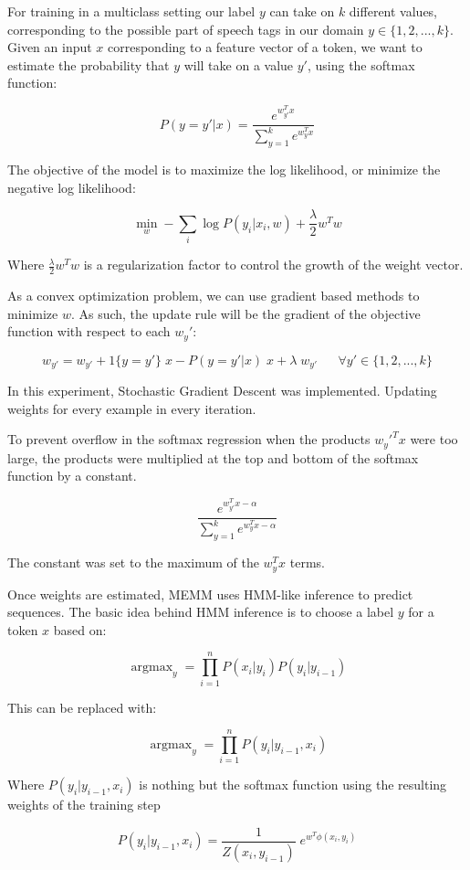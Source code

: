 \documentclass[11pt]{article}
\DeclareMathOperator{\argmax}{argmax}
\begin{document}
For training in a multiclass setting our label $y$ can take on $k$ different values, corresponding to the possible part of speech tags in our domain $y \in \{1,2, ..., k\}$. Given an input $x$ corresponding to a feature vector of a token, we want to estimate the probability that $y$ will take on a value $y'$, using the softmax function:

$$P(y=y'|x) = \frac{e^{w_{y'}^{T}x}}{\sum_{y=1}^{k} e^{w_{y}^{T} x}}$$

The objective of the model is to maximize the log likelihood, or minimize the negative log likelihood:

$$\min_w - \sum_{i} \log { P (y_i|x_i, w)} + \frac{\lambda}{2}	w^{T}w $$ 

Where $\frac{\lambda}{2}	w^{T}w $ is a regularization factor to control the growth of the weight vector. 

As a convex optimization problem, we can use gradient based methods to minimize $w$. As such, the update rule will be the gradient of the objective function with respect to each $w_y'$:

$$w_{y'} = w_{y'} + 1 \{y = y'\} \; x -  P(y = y'|x) \; x + \lambda \; w_{y'} \;\;\;\;\;\ \forall y' \in \{1,2, ... , k\}$$

In this experiment, Stochastic Gradient Descent was implemented. Updating weights for every example in every iteration. 

To prevent overflow in the softmax regression when the products $w_y'^{T}x$ were too large, the products were multiplied at the top and bottom of the softmax function by a constant. 

$$\frac{e^{w_{y'}^Tx - \alpha}}{\sum_{y=1}^{k} e^{w_{y}^T x - \alpha}}$$

The constant was set to the maximum of the $w_{y}^T x$ terms. 

Once weights are estimated, MEMM uses HMM-like inference to predict sequences. The basic idea behind HMM inference is to choose a label $y$ for a token $x$ based on: 

$$\argmax_y = \prod_{i = 1}^{n} P(x_i | y_i) P(y_i|y_{i-1})$$

This can be replaced with:

$$\argmax_y = \prod_{i=1}^{n} P(y_i | y_{i-1}, x_i)$$

Where $P(y_i | y_{i-1}, x_i)$ is nothing but the softmax function using the resulting weights of the training step

$$P(y_i | y_{i-1}, x_i) = \frac{1}{Z(x_i, y_{i-1})} \; e^{w^{T}\phi(x_i,y_i)}$$
\end{document}
